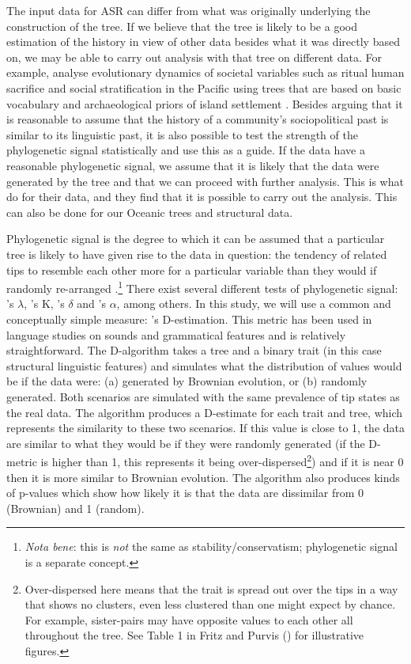 \documentclass[12pt,letterpaper]{article}
\begin{document}
The input data for ASR can differ from what was originally underlying the construction of the tree. If we believe that the tree is likely to be a good estimation of the history in view of other data besides what it was directly based on, we may be able to carry out analysis with that tree on different data. For example, \citet{watts2016ritual} analyse evolutionary dynamics of societal variables such as ritual human sacrifice and social stratification in the Pacific using trees that are based on basic vocabulary and archaeological priors of island settlement \citep{grayetal_2009}. Besides arguing that it is reasonable to assume that the history of a community's sociopolitical past is similar to its linguistic past, it is also possible to test the strength of the phylogenetic signal statistically and use this as a guide. If the data have a reasonable phylogenetic signal, we assume that it is likely that the data were generated by the tree and that we can proceed with further analysis. This is what \citet{watts2016ritual} do for their data, and they find that it is possible to carry out the analysis. This can also be done for our Oceanic trees and structural data.

Phylogenetic signal is the degree to which it can be assumed that a particular tree is likely to have given rise to the data in question: the tendency of related tips to resemble each other more for a particular variable than they would if randomly re-arranged \citep[905]{blomberg2002tempo}.\footnote{\textit{Nota bene}: this is \textit{not} the same as stability/conservatism; phylogenetic signal is a separate concept.} There exist several different tests of phylogenetic signal: \citet{pagel1999inferring}'s $\lambda$, \citet{blomberg2003testing}'s K, \citet{borges2019measuring}'s $\delta$ and \citet{ives2010phylogenetic}'s $\alpha$, among others. In this study, we will use a common and conceptually simple measure: \citet{fritz2010selectivity}'s D-estimation. This metric has been used in language studies on sounds \citep{macklin2021phylogenetic} and grammatical features \citep{hubler2022phylogenetic} and is relatively straightforward. The D-algorithm takes a tree and a binary trait (in this case structural linguistic features) and simulates what the distribution of values would be if the data were: (a) generated by Brownian evolution, or (b) randomly generated. Both scenarios are simulated with the same prevalence of tip states as the real data. The algorithm produces a D-estimate for each trait and tree, which represents the similarity to these two scenarios. If this value is close to 1, the data are similar to what they would be if they were randomly generated (if the D-metric is higher than 1, this represents it being over-dispersed\footnote{Over-dispersed here means that the trait is spread out over the tips in a way that shows no clusters, even less clustered than one might expect by chance. For example, sister-pairs may have opposite values to each other all throughout the tree. See Table 1 in Fritz and Purvis (\citeyear[1044]{fritz2010selectivity}) for illustrative figures.}) and if it is near 0 then it is more similar to Brownian evolution. The algorithm also produces kinds of p-values which show how likely it is that the data are dissimilar from 0 (Brownian) and 1 (random).
\end{document}
